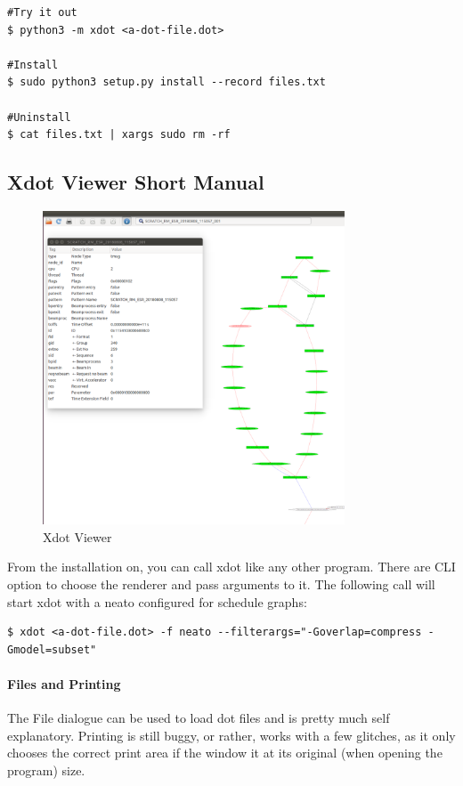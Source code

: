 \begin{lstlisting}[style = customshell]
#Try it out
$ python3 -m xdot <a-dot-file.dot>

#Install
$ sudo python3 setup.py install --record files.txt

#Uninstall
$ cat files.txt | xargs sudo rm -rf
\end{lstlisting}

\subsection{Xdot Viewer Short Manual}

\begin{figure}[H]
   \centering
   \includegraphics*[width=0.8\textwidth,keepaspectratio]{Figures/xdot}
   \caption{Xdot Viewer}
   \label{fig:xdot}
\end{figure}
%
From the installation on, you can call xdot like any other program. There are CLI option to choose the renderer and pass arguments to it. The following call will start xdot with a neato configured for schedule graphs:
%
\begin{lstlisting}[style = customshell]
$ xdot <a-dot-file.dot> -f neato --filterargs="-Goverlap=compress -Gmodel=subset"
\end{lstlisting}

\paragraph{Files and Printing}
The File dialogue can be used to load dot files and is pretty much self explanatory. Printing is still buggy, or rather, works with a few glitches, as it only chooses the correct print area if the window
it at its original (when opening the program) size.

